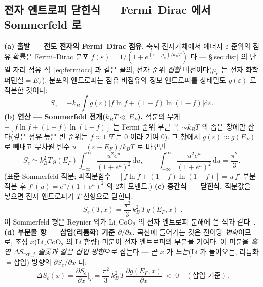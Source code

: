 \documentclass[11pt,a4paper]{article}
\newcommand{\dd}{\mathrm{d}}
\newcommand{\rxn}{\mathrm{rxn}}
\begin{document}
\subsection{전자 엔트로피 닫힌식 — Fermi--Dirac 에서 Sommerfeld 로}
\textbf{(a) 출발 — 전도 전자의 Fermi--Dirac 점유.} 축퇴 전자기체에서 에너지 $\varepsilon$ 준위의 점유 확률은
Fermi--Dirac 분포 $f(\varepsilon)=1/(1+e^{(\varepsilon-\mu_e)/k_BT})$ 다 — \S\ref{sec:dist} 의 단일 자리 점유
식~\eqref{eq:fermiocc} 과 같은 꼴의, 전자 준위 \emph{집합} 버전이다($\mu_e$ 는 전자 화학퍼텐셜$=E_F$). 분포의
엔트로피는 점유$\cdot$비점유의 정보 엔트로피를 상태밀도 $g(\varepsilon)$ 로 적분한 것이다:
\begin{equation}
S_e=-k_B\!\int\! g(\varepsilon)\big[f\ln f+(1-f)\ln(1-f)\big]\dd\varepsilon.
\label{eq:Sfd}
\end{equation}
\textbf{(b) 연산 — Sommerfeld 전개($k_BT\ll E_F$).} 적분의 무게 $-[f\ln f+(1-f)\ln(1-f)]$ 는 Fermi 준위 부근
폭 $\sim k_BT$ 의 좁은 창에만 산다(깊은 점유$\cdot$높은 빈 준위는 $f\!\approx\!1$ 또는 $0$ 이라 기여 $0$). 그 창에서
$g(\varepsilon)\approx g(E_F)$ 로 빼내고 무차원 변수 $u=(\varepsilon-E_F)/k_BT$ 로 바꾸면
\begin{equation}
S_e\simeq k_B^2T\,g(E_F)\!\int_{-\infty}^{\infty}\!\frac{u^2 e^{u}}{(1+e^{u})^2}\,\dd u,
\qquad \int_{-\infty}^{\infty}\!\frac{u^2 e^{u}}{(1+e^{u})^2}\,\dd u=\frac{\pi^2}{3}.
\label{eq:sommerfeld}
\end{equation}
(표준 Sommerfeld 적분; 피적분함수 $-[f\ln f+(1-f)\ln(1-f)]=u\,f'$ 부분적분 후 $f'(u)=e^u/(1+e^u)^2$ 의 2차
모멘트.) \textbf{(c) 중간식 — 닫힌식.} 적분값을 넣으면 전자 엔트로피가 $T$-선형으로 닫힌다:
\begin{equation}
\boxed{\;S_e(T,x)=\frac{\pi^2}{3}\,k_B^2\,T\,g(E_F,x)\;.}
\label{eq:Se}
\end{equation}
이 Sommerfeld 형은 Reynier 외가 Li$_x$CoO$_2$ 의 전자 엔트로피 분해에 쓴 식과 같다~\cite{reynier2004}.
\textbf{(d) 부분몰 항 — 삽입(리튬화) 기준 $\partial/\partial x$.} 곡선에 들어가는 것은 전이당 \emph{변화}이므로,
조성 $x$(Li$_x$CoO$_2$ 의 Li 함량) 미분이 전자 엔트로피의 부분몰 기여다. 이 미분을 \emph{흑연 $\Delta S_{\rxn,j}$
슬롯과 같은 삽입 방향}으로 잡는다 — 곧 $x$ 가 \emph{느는}(Li 가 들어오는, 리튬화$=$삽입) 방향의 $\partial S_e/\partial x$ 다:
\begin{equation}
\boxed{\;\Delta S_e(x)=\frac{\partial S_e}{\partial x}\Big|_T
=\frac{\pi^2}{3}\,k_B^2\,T\,\frac{\partial g(E_F,x)}{\partial x}\;<\;0\quad(\text{삽입 기준}).}
\label{eq:dSe}
\end{equation}
\end{document}
